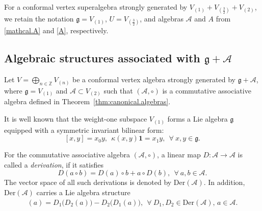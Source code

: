 \documentclass[12pt]{article}
\numberwithin{equation}{section}
\theoremstyle{definition}
\theoremstyle{plain}
\newcommand{\bZ}{\ensuremath{\mathbb{Z}}}
\newcommand{\fg}{\mathfrak{g}}
\newcommand{\Der}{\mathrm{Der }}
\newcommand{\cA}{\ensuremath{\mathcal{A}}}
\newcommand{\bone}{\mathbf{1 }}
\begin{document}
For a conformal vertex superalgebra strongly generated by $V_{(1)}+V_{(\frac32)}+V_{(2)}$, we retain the notation $\fg=V_{(1)}$, $U=V_{(\frac32)}$, and algebras $\cA$ and $A$ from \eqref{mathcal.A} and \eqref{A}, respectively.

\subsection{Algebraic structures associated with $\fg+\cA$}\label{sect:even.generators}
\hspace{1.5em}Let $V=\bigoplus_{n\in\bZ}V_{(n)}$ be a conformal vertex algebra strongly generated by $\fg+\cA$, where $\fg=V_{(1)}$ and $\cA\subset V_{(2)}$ such that $(\cA,\circ)$ is a commutative associative algebra defined in Theorem~\ref{thm:canonical.algebras}. 

It is well known that the weight-one subspace $V_{(1)}$ forms a Lie algebra $\fg$ equipped with a symmetric invariant bilinear form:
\begin{equation}\label{Lie}
    [x,y]=x_0y,\ \ \kappa(x,y)\bone=x_1y,\ \ \forall\ x,y\in\fg.
\end{equation}

For the commutative associative algebra $(\cA,\circ)$, a linear map $D:\cA\rightarrow \cA$ is called a \emph{derivation}, if it satisfies 
\begin{equation*}
    D(a\circ b)=D(a)\circ b+a\circ D(b),\ \ \forall\ a,b\in\cA.
\end{equation*}
The vector space of all such derivations is denoted by $\Der(\cA)$. In addition, $\Der(\cA)$ carries a Lie algebra structure
\begin{align*}
    [D_1,D_2](a)=D_1\big(D_2(a)\big)-D_2\big(D_1(a)\big),\ \ \forall\ D_1,D_2\in\Der(\cA),\, a\in \cA.
\end{align*}
\end{document}
